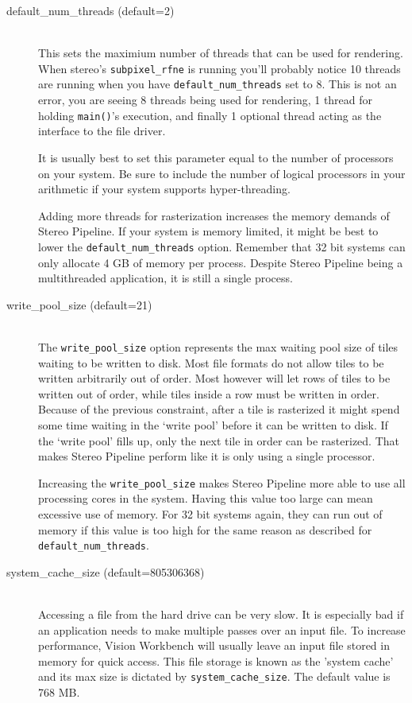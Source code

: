 \begin{description}

\item[default\_num\_threads \textnormal (default=2)] \hfill \\
This sets the maximium number of threads that can be used for
rendering. When stereo's \texttt{subpixel\_rfne} is running you'll
probably notice 10 threads are running when you have
\texttt{default\_num\_threads} set to 8. This is not an error, you are
seeing 8 threads being used for rendering, 1 thread for holding
\texttt{main()}'s execution, and finally 1 optional thread acting as the
interface to the file driver.

It is usually best to set this parameter equal to the number of
processors on your system. Be sure to include the number of logical
processors in your arithmetic if your system supports hyper-threading.

Adding more threads for rasterization increases the memory demands of
Stereo Pipeline. If your system is memory limited, it might be best to
lower the \texttt{default\_num\_threads} option. Remember that 32 bit
systems can only allocate 4 GB of memory per process. Despite Stereo
Pipeline being a multithreaded application, it is still a single
process.

\item[write\_pool\_size \textnormal (default=21)] \hfill \\
The \texttt{write\_pool\_size} option represents the max waiting pool
size of tiles waiting to be written to disk. Most file formats do not
allow tiles to be written arbitrarily out of order. Most however will
let rows of tiles to be written out of order, while tiles inside a row
must be written in order. Because of the previous constraint, after a
tile is rasterized it might spend  some time waiting in the `write
pool' before it can be written to disk. If the `write pool' fills up,
only the next tile in order can be rasterized. That makes Stereo
Pipeline perform like it is only using a single processor.

Increasing the \texttt{write\_pool\_size} makes Stereo Pipeline more
able to use all processing cores in the system. Having this value too
large can mean excessive use of memory. For 32 bit systems again, they
can run out of memory if this value is too high for the same reason as
described for \texttt{default\_num\_threads}.

\item[system\_cache\_size \textnormal (default=805306368)] \hfill \\
Accessing a file from the hard drive can be very slow. It is especially
bad if an application needs to make multiple passes over an input
file. To increase performance, Vision Workbench will usually leave an
input file stored in memory for quick access. This file storage is
known as the 'system cache' and its max size is dictated by
\texttt{system\_cache\_size}. The default value is 768 MB.


\end{description}
